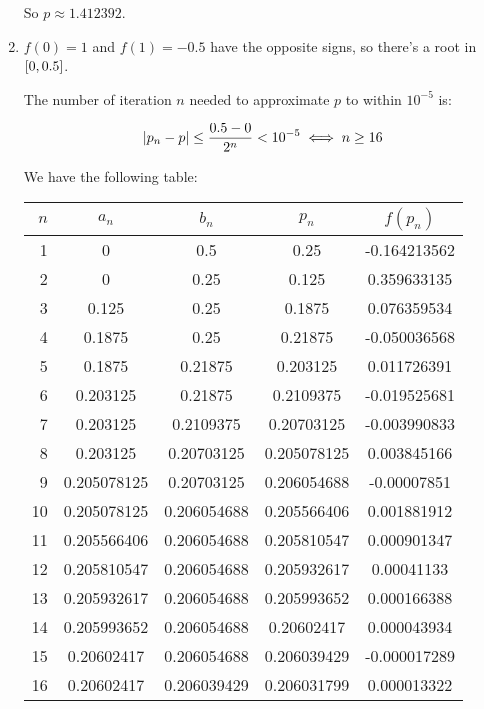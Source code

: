 \documentclass[../../Assignments.tex]{subfiles}
\begin{document}
\begin{solution}
\begin{enumerate}
            So \(p \approx \num{1.412392}\).

        \item \(f(0) = 1\) and \(f(1) = \num{-0.5}\) have the opposite signs, so
            there's a root in \(\interval{0}{\num{0.5}}\).

            The number of iteration \(n\) needed to approximate \(p\) to within
            \(10^{-5}\) is:

            \[\abs{p_n - p} \leq \frac{\num{0.5} - 0}{2^n} < 10^{-5} \iff n \geq 16\]

            We have the following table:

            \begin{longtable}{r S[table-format=1.9] S[table-format=1.9] S[table-format=1.9] S[table-format=-1.9]}
                \toprule
                \(n\)  &   {\(a_n\)}   &   {\(b_n\)}   &   {\(p_n\)}   &  {\(f(p_n)\)}  \\
                  &  0            &  0.5          &  0.25         &  -0.164213562  \\
                    2  &  0            &  0.25         &  0.125        &   0.359633135  \\
                    3  &  0.125        &  0.25         &  0.1875       &   0.076359534  \\
                    4  &  0.1875       &  0.25         &  0.21875      &  -0.050036568  \\
                    5  &  0.1875       &  0.21875      &  0.203125     &   0.011726391  \\
                    6  &  0.203125     &  0.21875      &  0.2109375    &  -0.019525681  \\
                    7  &  0.203125     &  0.2109375    &  0.20703125   &  -0.003990833  \\
                    8  &  0.203125     &  0.20703125   &  0.205078125  &   0.003845166  \\
                    9  &  0.205078125  &  0.20703125   &  0.206054688  &  -0.00007851   \\
                   10  &  0.205078125  &  0.206054688  &  0.205566406  &   0.001881912  \\
                   11  &  0.205566406  &  0.206054688  &  0.205810547  &   0.000901347  \\
                   12  &  0.205810547  &  0.206054688  &  0.205932617  &   0.00041133   \\
                   13  &  0.205932617  &  0.206054688  &  0.205993652  &   0.000166388  \\
                   14  &  0.205993652  &  0.206054688  &  0.20602417   &   0.000043934  \\
                   15  &  0.20602417   &  0.206054688  &  0.206039429  &  -0.000017289  \\
                   16  &  0.20602417   &  0.206039429  &  0.206031799  &   0.000013322  \\
                   \bottomrule
            \end{longtable}


\end{enumerate}
\end{solution}
\end{document}
